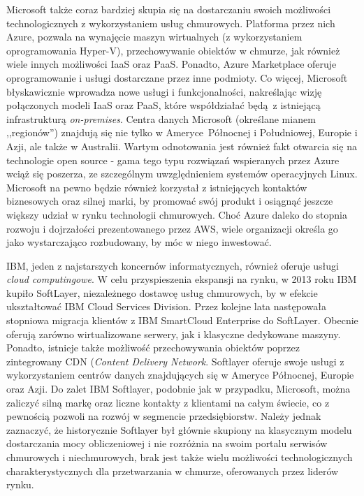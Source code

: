 \documentclass[12pt,a4paper,twoside]{article}
\begin{document}
Microsoft także coraz bardziej skupia się na dostarczaniu swoich możliwości technologicznych z wykorzystaniem usług chmurowych. Platforma przez nich Azure, pozwala na wynajęcie maszyn wirtualnych (z wykorzystaniem oprogramowania Hyper-V), przechowywanie obiektów w chmurze, jak również wiele innych możliwości IaaS oraz PaaS. Ponadto, Azure Marketplace oferuje oprogramowanie i usługi dostarczane przez inne podmioty. Co więcej, Microsoft błyskawicznie wprowadza nowe usługi i funkcjonalności, nakreślając wizję połączonych modeli IaaS oraz PaaS, które współdziałać będą z istniejącą infrastrukturą \textit{on-premises}.  Centra danych Microsoft (określane mianem ,,regionów'') znajdują się nie tylko w Ameryce Północnej i Południowej, Europie i Azji, ale także w Australii. Wartym odnotowania jest również fakt otwarcia się na technologie open source - gama tego typu rozwiązań wspieranych przez Azure wciąż się poszerza, ze szczególnym uwzględnieniem systemów operacyjnych Linux. Microsoft na pewno będzie również korzystał z istniejących kontaktów biznesowych oraz silnej marki, by promować swój produkt i osiągnąć jeszcze większy udział w rynku technologii chmurowych. Choć Azure daleko do stopnia rozwoju i dojrzałości prezentowanego przez AWS, wiele organizacji określa go jako wystarczająco rozbudowany, by móc w niego inwestować.

IBM, jeden z najstarszych koncernów informatycznych, również oferuje usługi \textit{cloud computingowe}. W celu przyspieszenia ekspansji na rynku, w 2013 roku IBM kupiło SoftLayer, niezależnego dostawcę usług chmurowych, by w efekcie ukształtować IBM Cloud Services Division. Przez kolejne lata następowała stopniowa migracja klientów z IBM SmartCloud Enterprise do SoftLayer. Obecnie oferują zarówno wirtualizowane serwery, jak i klasyczne dedykowane maszyny. Ponadto, istnieje także możliwość przechowywania obiektów poprzez zintegrowany CDN (\textit{Content Delivery Network}. Softlayer oferuje swoje usługi z wykorzystaniem centrów danych znajdujących się w Ameryce Północnej, Europie oraz Azji. Do zalet IBM Softlayer, podobnie jak w przypadku, Microsoft, można zaliczyć silną markę oraz liczne kontakty z klientami na całym świecie, co z pewnością pozwoli na rozwój w segmencie przedsiębiorstw. Należy jednak zaznaczyć, że historycznie Softlayer był głównie skupiony na klasycznym modelu dostarczania mocy obliczeniowej i nie rozróżnia na swoim portalu serwisów chmurowych i niechmurowych, brak jest także wielu możliwości technologicznych charakterystycznych dla przetwarzania w chmurze, oferowanych przez liderów rynku.
\end{document}
